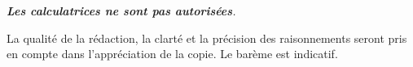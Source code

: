 \documentclass[12pt,french]{book}
\begin{document}
\thispagestyle{garde}

\medskip







\begin{center}
\begin{minipage}{0.8\linewidth}
\begin{center}
\itshape
\textbf{Les calculatrices ne sont pas autorisées}.\par
La qualité de la rédaction, la clarté et la précision des raisonnements seront pris en compte dans l'appréciation de la copie.
Le barème est indicatif.
\end{center}
\end{minipage}
\end{center}

\noindent


\end{document}
